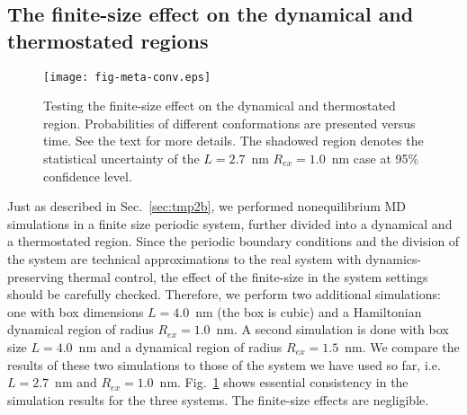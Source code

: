 \documentclass[journal=jctcce,manuscript=manuscript]{achemso}
\begin{document}
\subsection{The finite-size effect on the dynamical and thermostated regions}

\begin{figure}
  \centering
  \texttt{[image: fig-meta-conv.eps]}
  \caption{Testing the finite-size effect on the dynamical and thermostated region.
    Probabilities of different conformations are presented versus time.
    See the text for more details.
    {The shadowed region denotes the
      statistical uncertainty of the $L=2.7$~nm $R_{ex}=1.0$~nm case at 95\% confidence level.
    }
  }
  \label{fig:tmp7}
\end{figure}

Just as described in Sec.~\ref{sec:tmp2b}, we performed nonequilibrium MD
simulations in a finite size periodic system, further divided 
into a dynamical and a thermostated region.
Since the periodic boundary conditions and the division of the system
are technical approximations to the real system with dynamics-preserving thermal control, 
the effect of the finite-size in 
the system settings should be carefully checked.
Therefore, we
perform two additional simulations: one with box dimensions
$L=4.0$~nm (the box is cubic) and a
Hamiltonian dynamical region of radius $R_{ex} = 1.0$~nm. A second simulation is done with box size $L=4.0$~nm and a dynamical region of
radius $R_{ex} = 1.5$~nm. We compare the results of these two simulations to those of the system we have used so far, i.e. $L=2.7$~nm and $R_{ex} = 1.0$~nm.
Fig.~\ref{fig:tmp7} shows essential consistency in
the simulation results for the three systems. The finite-size effects are
negligible.
\end{document}

